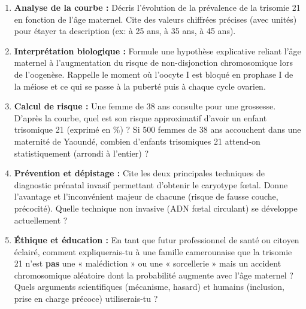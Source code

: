 \documentclass[11pt]{article}
\begin{document}
\begin{exercice}
\begin{enumerate}
    \item \textbf{Analyse de la courbe :} Décris l'évolution de la prévalence de la trisomie 21 en fonction de l'âge maternel. Cite des valeurs chiffrées précises (avec unités) pour étayer ta description (ex: à 25 ans, à 35 ans, à 45 ans).
    \item \textbf{Interprétation biologique :} Formule une hypothèse explicative reliant l'âge maternel à l'augmentation du risque de non-disjonction chromosomique lors de l'oogenèse. Rappelle le moment où l'oocyte I est bloqué en prophase I de la méiose et ce qui se passe à la puberté puis à chaque cycle ovarien.
    \item \textbf{Calcul de risque :} Une femme de 38 ans consulte pour une grossesse. D'après la courbe, quel est son risque approximatif d'avoir un enfant trisomique 21 (exprimé en \%) ? Si 500 femmes de 38 ans accouchent dans une maternité de Yaoundé, combien d'enfants trisomiques 21 attend-on statistiquement (arrondi à l'entier) ?
    \item \textbf{Prévention et dépistage :} Cite les deux principales techniques de diagnostic prénatal invasif permettant d'obtenir le caryotype fœtal. Donne l'avantage et l'inconvénient majeur de chacune (risque de fausse couche, précocité). Quelle technique non invasive (ADN fœtal circulant) se développe actuellement ?
    \item \textbf{Éthique et éducation :} En tant que futur professionnel de santé ou citoyen éclairé, comment expliquerais-tu à une famille camerounaise que la trisomie 21 n'est \textbf{pas} une « malédiction » ou une « sorcellerie » mais un accident chromosomique aléatoire dont la probabilité augmente avec l'âge maternel ? Quels arguments scientifiques (mécanisme, hasard) et humains (inclusion, prise en charge précoce) utiliserais-tu ?
\end{enumerate}
\end{exercice}
\end{document}
